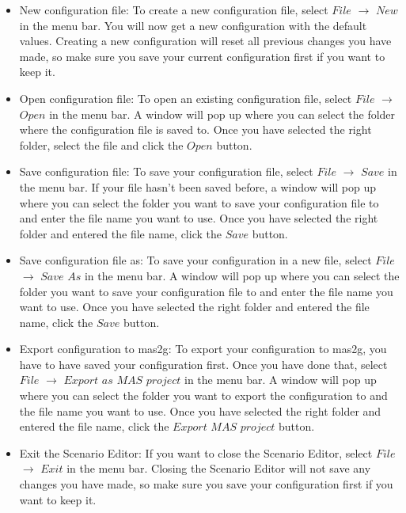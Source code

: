 \begin{itemize}

\item{New configuration file}:
To create a new configuration file, select $File$ $\to$ $New$ in the menu bar. You will now get a new configuration with the default values. Creating a new configuration will reset all previous changes you have made, so make sure you save your current configuration first if you want to keep it.

\item{Open configuration file}:
To open an existing configuration file, select $File$ $\to$ $Open$ in the menu bar. A window will pop up where you can select the folder where the configuration file is saved to. Once you have selected the right folder, select the file and click the $Open$ button.

\item{Save configuration file}:
To save your configuration file, select $File$ $\to$ $Save$ in the menu bar. If your file hasn't been saved before, a window will pop up where you can select the folder you want to save your configuration file to and enter the file name you want to use. Once you have selected the right folder and entered the file name, click the $Save$ button.

\item{Save configuration file as}:
To save your configuration in a new file, select $File$ $\to$ $Save$ $As$ in the menu bar. A window will pop up where you can select the folder you want to save your configuration file to and enter the file name you want to use. Once you have selected the right folder and entered the file name, click the $Save$ button.

\item{Export configuration to mas2g}:
To export your configuration to mas2g, you have to have saved your configuration first. Once you have done that, select $File$ $\to$ $Export$ $as$ $MAS$ $project$ in the menu bar. A window will pop up where you can select the folder you want to export the configuration to and the file name you want to use. Once you have selected the right folder and entered the file name, click the $Export$ $MAS$ $project$ button.

\item{Exit the Scenario Editor}:
If you want to close the Scenario Editor, select $File$ $\to$ $Exit$ in the menu bar. Closing the Scenario Editor will not save any changes you have made, so make sure you save your configuration first if you want to keep it.
\end{itemize}



